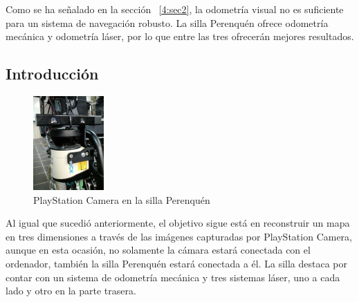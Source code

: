 
Como se ha señalado en la sección ~\ref{4:sec2}, la odometría visual no es
suficiente para un sistema de navegación robusto. La silla Perenquén ofrece
odometría mecánica y odometría láser, por lo que entre las tres ofrecerán
mejores resultados.

\subsection{Introducción}

\begin{figure}
  \vspace{-20pt}
  \begin{center}
    \includegraphics[width=0.24\textwidth]{images/cap4/Perenquen-camara.eps}
  \end{center}
  \vspace{-20pt}
  \caption{PlayStation Camera en la silla Perenquén}
  \vspace{-10pt}
  \label{fig:Perenquen-Camara}
\end{figure}

Al igual que sucedió anteriormente, el objetivo sigue está en reconstruir un
mapa en tres dimensiones a través de las imágenes capturadas por PlayStation
Camera, aunque en esta ocasión, no solamente la cámara estará conectada con el
ordenador, también la silla Perenquén estará conectada a él. La silla destaca
por contar con un sistema de odometría mecánica y tres sistemas láser, uno a
cada lado y otro en la parte trasera.

